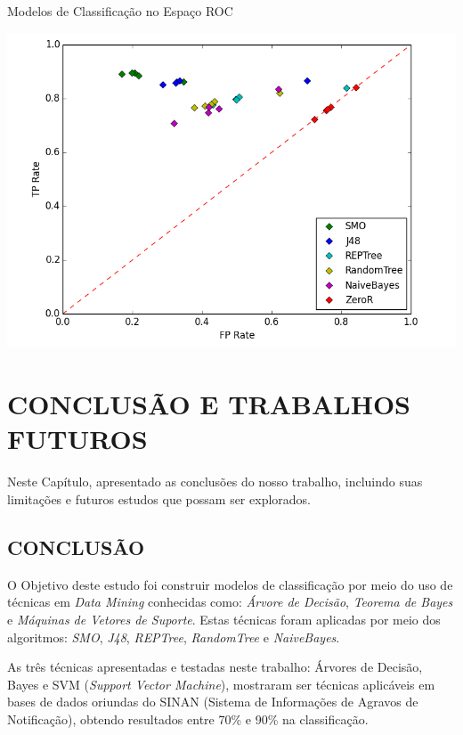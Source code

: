 \documentclass[
	12pt,				%
	openright,			%
	oneside,	
	a4paper,				%
	english,				%
	brazil				%
]{abntex2/abntex2} %
\begin{document}
	\begin{grafico}[!htb]
		\caption{\label{graficoTodosModelos} \fontsize{10}{\baselineskip} \selectfont Modelos de Classificação no Espaço ROC}
		\begin{center}
			\includegraphics[scale=0.6]{python/TodosModelos.png}
		\end{center}
	\end{grafico}
	
\chapter{CONCLUSÃO E TRABALHOS FUTUROS}

	Neste Capítulo, apresentado as conclusões do nosso trabalho, incluindo suas limitações  e futuros estudos que possam ser explorados. 

	\section{CONCLUSÃO}

	O Objetivo deste estudo foi construir modelos de classificação por meio do uso de técnicas em \textit{Data Mining} conhecidas como: \textit{Árvore de Decisão}, \textit{Teorema de Bayes} e \textit{Máquinas de Vetores de Suporte}. Estas técnicas foram aplicadas por meio dos algoritmos: \textit{SMO}, \textit{J48}, \textit{REPTree}, \textit{RandomTree} e \textit{NaiveBayes}.
	
	As três técnicas apresentadas e testadas neste trabalho: Árvores de Decisão, Bayes e SVM (\textit{Support Vector Machine}), mostraram ser técnicas aplicáveis em bases de dados oriundas do SINAN (Sistema de Informações de Agravos de Notificação), obtendo resultados entre 70\% e 90\% na classificação.
	
\end{document}
